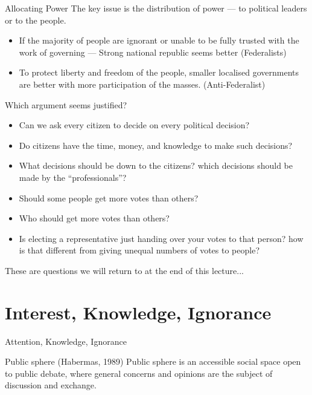 \documentclass{beamer}
\begin{document}
\begin{frame}{Allocating Power}
The key issue is the distribution of power — to political leaders or to the people.
\begin{itemize}
    \item If the majority of people are ignorant or unable to be fully trusted with the work of governing — Strong national republic seems better (Federalists)
    \item To protect liberty and freedom of the people, smaller localised governments are better with more participation of the masses.  (Anti-Federalist)
\end{itemize}

\end{frame}




\begin{frame}{Which argument seems justified? }
\begin{itemize}
    \item Can we ask every citizen to decide on every political decision?
    \item Do citizens have the time,  money, and knowledge to make such decisions?
    \item What decisions should be down to the citizens? which decisions should be made by the “professionals”?
    \item Should some people get more votes than others?
    \item Who should get more votes than others?
    \item Is electing a representative just handing over your votes to that person? how is that different from giving unequal numbers of votes to people?
\end{itemize}
\end{frame}

\begin{frame}{}
These are questions we will return to at the end of this lecture...
\end{frame}



\section{Interest, Knowledge, Ignorance}

\begin{frame}{Attention, Knowledge, Ignorance}
\begin{block}{Public sphere (Habermas, 1989) }
 Public sphere is an accessible social space open to public debate, where general concerns and opinions are the subject of discussion and exchange.
 \end{block}
\end{frame}
\end{document}
